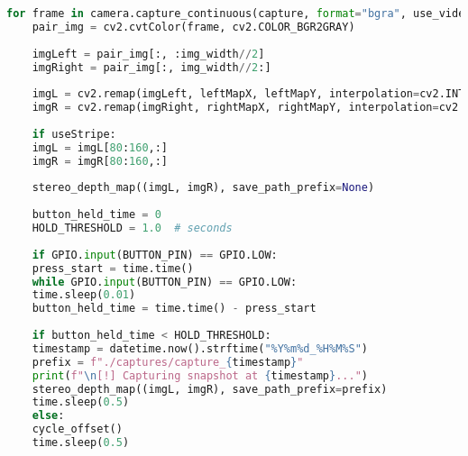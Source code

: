 \begin{lstlisting}[language=Python, breaklines=true,caption={Main loop for capturing stereo image pairs, remapping them for rectification,and estimating depth}]
	for frame in camera.capture_continuous(capture, format="bgra", use_video_port=True, resize=(img_width,img_height)):
	pair_img = cv2.cvtColor(frame, cv2.COLOR_BGR2GRAY)
	
	imgLeft = pair_img[:, :img_width//2]
	imgRight = pair_img[:, img_width//2:]
	
	imgL = cv2.remap(imgLeft, leftMapX, leftMapY, interpolation=cv2.INTER_LINEAR, borderMode=cv2.BORDER_CONSTANT)
	imgR = cv2.remap(imgRight, rightMapX, rightMapY, interpolation=cv2.INTER_LINEAR, borderMode=cv2.BORDER_CONSTANT)
	
	if useStripe:
	imgL = imgL[80:160,:]
	imgR = imgR[80:160,:]
	
	stereo_depth_map((imgL, imgR), save_path_prefix=None)
	
	button_held_time = 0
	HOLD_THRESHOLD = 1.0  # seconds
	
	if GPIO.input(BUTTON_PIN) == GPIO.LOW:
	press_start = time.time()
	while GPIO.input(BUTTON_PIN) == GPIO.LOW:
	time.sleep(0.01)
	button_held_time = time.time() - press_start
	
	if button_held_time < HOLD_THRESHOLD:
	timestamp = datetime.now().strftime("%Y%m%d_%H%M%S")
	prefix = f"./captures/capture_{timestamp}"
	print(f"\n[!] Capturing snapshot at {timestamp}...")
	stereo_depth_map((imgL, imgR), save_path_prefix=prefix)
	time.sleep(0.5)
	else:
	cycle_offset()
	time.sleep(0.5)
\end{lstlisting}

%


